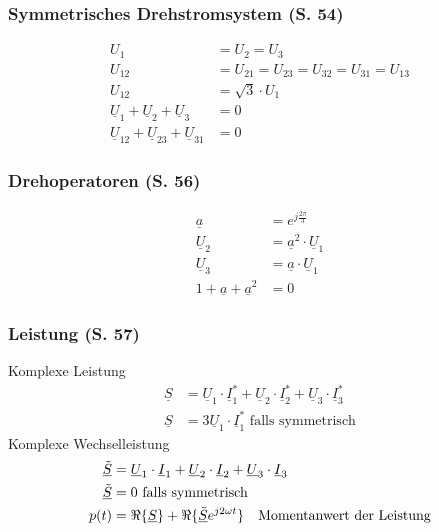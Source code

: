 \documentclass[a4paper,twocolumn,10pt]{article}
\begin{document}
\subsubsection{Symmetrisches Drehstromsystem (S. 54)}
\begin{equation*}
\begin{split}
U_1&=U_2=U_3\\
U_{12}&=U_{21}=U_{23}=U_{32}=U_{31}=U_{13}\\
U_{12}&=\sqrt{3}\cdot U_1\\
\underline{U}_1+\underline{U}_2+\underline{U}_3&=0\\
\underline{U}_{12}+\underline{U}_{23}+\underline{U}_{31}&=0
\end{split}
\end{equation*}

\subsubsection{Drehoperatoren (S. 56)}
\begin{equation*}
\begin{split}
\underline{a}&=e^{j\frac{2\pi}{3}}\\
\underline{U}_2&=\underline{a}^2\cdot\underline{U}_1\\
\underline{U}_3&=\underline{a}\cdot\underline{U}_1\\
1+\underline{a}+\underline{a}^2&=0
\end{split}
\end{equation*}

\subsubsection{Leistung (S. 57)}
Komplexe Leistung
\begin{equation*}
\begin{split}
\underline{S}&=\underline{U}_1\cdot\underline{I}_1^*+\underline{U}_2\cdot\underline{I}_2^*+\underline{U}_3\cdot\underline{I}_3^*\\
\underline{S}&=3\underline{U}_1\cdot\underline{I}_1^*\text{ falls symmetrisch}
\end{split}
\end{equation*}
Komplexe Wechselleistung
\begin{equation*}
\begin{split}
\underline{\tilde{S}}&=\underline{U}_1\cdot\underline{I}_1+\underline{U}_2\cdot\underline{I}_2+\underline{U}_3\cdot\underline{I}_3\\
\underline{\tilde{S}}&=0\text{ falls symmetrisch}\\
p(t)&=\Re\{\underline{S}\}+\Re\{\underline{\tilde{S}}e^{j 2\omega t}\}\text{\quad Momentanwert der Leistung}
\end{split}
\end{equation*}
\end{document}
